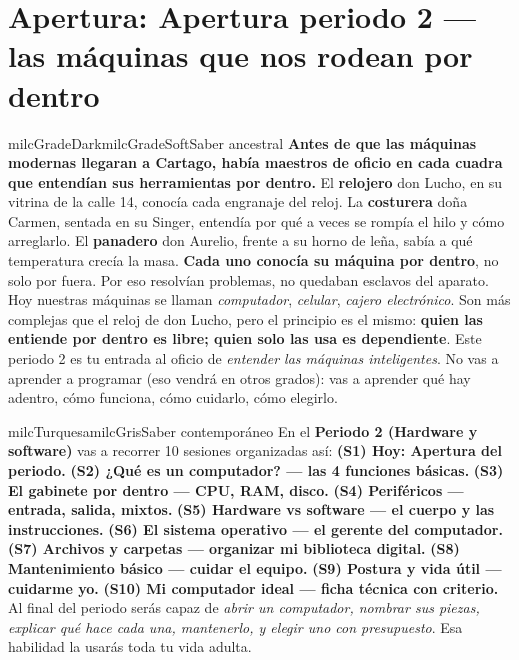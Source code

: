 \documentclass[11pt,letterpaper]{article}
\begin{document}
\section*{Apertura: Apertura periodo 2 --- las máquinas que nos rodean por dentro}

\begin{softbox}{milcGradeDark}{milcGradeSoft}{Saber ancestral}
\textbf{Antes de que las máquinas modernas llegaran a Cartago, había maestros de oficio en cada cuadra que entendían sus herramientas por dentro.} El \textbf{relojero} don Lucho, en su vitrina de la calle 14, conocía cada engranaje del reloj. La \textbf{costurera} doña Carmen, sentada en su Singer, entendía por qué a veces se rompía el hilo y cómo arreglarlo. El \textbf{panadero} don Aurelio, frente a su horno de leña, sabía a qué temperatura crecía la masa. \textbf{Cada uno conocía su máquina por dentro}, no solo por fuera. Por eso resolvían problemas, no quedaban esclavos del aparato. Hoy nuestras máquinas se llaman \emph{computador}, \emph{celular}, \emph{cajero electrónico}. Son más complejas que el reloj de don Lucho, pero el principio es el mismo: \textbf{quien las entiende por dentro es libre; quien solo las usa es dependiente}. Este periodo 2 es tu entrada al oficio de \emph{entender las máquinas inteligentes}. No vas a aprender a programar (eso vendrá en otros grados): vas a aprender qué hay adentro, cómo funciona, cómo cuidarlo, cómo elegirlo.
\end{softbox}

\begin{softbox}{milcTurquesa}{milcGris}{Saber contemporáneo}
En el \textbf{Periodo 2 (Hardware y software)} vas a recorrer 10 sesiones organizadas así: \textbf{(S1) Hoy: Apertura del periodo.} \textbf{(S2) ¿Qué es un computador? --- las 4 funciones básicas.} \textbf{(S3) El gabinete por dentro --- CPU, RAM, disco.} \textbf{(S4) Periféricos --- entrada, salida, mixtos.} \textbf{(S5) Hardware vs software --- el cuerpo y las instrucciones.} \textbf{(S6) El sistema operativo --- el gerente del computador.} \textbf{(S7) Archivos y carpetas --- organizar mi biblioteca digital.} \textbf{(S8) Mantenimiento básico --- cuidar el equipo.} \textbf{(S9) Postura y vida útil --- cuidarme yo.} \textbf{(S10) Mi computador ideal --- ficha técnica con criterio.} Al final del periodo serás capaz de \emph{abrir un computador, nombrar sus piezas, explicar qué hace cada una, mantenerlo, y elegir uno con presupuesto}. Esa habilidad la usarás toda tu vida adulta.
\end{softbox}
\end{document}
